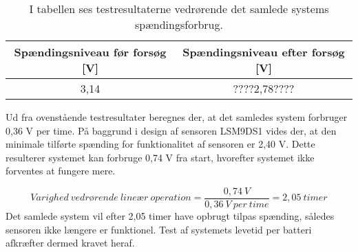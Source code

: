 \begin{table}[H]
	\centering
	\begin{tabular}{cc}
		\hline
		\rowcolor[HTML]{C0C0C0} 
		Spændingsniveau før forsøg {[}V{]} & Spændingsniveau efter forsøg {[}V{]} \\ \hline
		3,14 & ????2,78???? \\ \hline
	\end{tabular}
	\caption{I tabellen ses testresultaterne vedrørende det samlede systems spændingsforbrug.}
	\label{tab:test_spaending}
\end{table} \vspace{-.5cm}
Ud fra ovenstående testresultater beregnes der, at det samledes system forbruger 0,36 V per time. På baggrund i design af sensoren LSM9DS1 vides der, at den minimale tilførte spænding for funktionalitet af sensoren er 2,40 V. Dette resulterer systemet kan forbruge 0,74 V fra start, hvorefter systemet ikke forventes at fungere mere. 

\begin{equation}
Varighed~vedr\text{ø}rende~line\text{æ}r~operation = \frac{0,74~V}{0,36~V~per~time} = 2,05~timer
\end{equation}   
Det samlede system vil efter 2,05 timer have opbrugt tilpas spænding, således sensoren ikke længere er funktionel. %
Test af systemets levetid per batteri afkræfter dermed kravet heraf.

